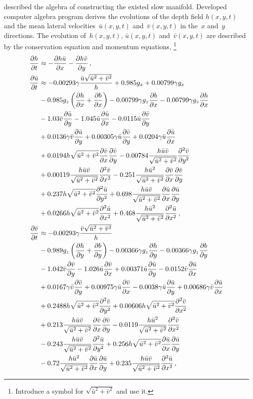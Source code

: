 \documentclass[12pt,a5paper]{article}
\newcommand{\uu}{{\bar u}}
\newcommand{\vv}{{\bar v}}
\begin{document}
\cite{Roberts:2008fk} described the algebra of constructing the existed slow manifold. Developed computer algebra program derives the evolutions of the depth field $h(x,y,t)$ and the mean lateral velocities~$\bar u(x,y,t)$ and~$\bar v(x,y,t)$ in the~$x$ and~$y$ directions. The evolution of~$h(x,y,t)$, $\bar u(x,y,t)$ and~$\bar v(x,y,t)$ are described by the conservation equation and momentum equations,
\footnote{Introduce a symbol for $\sqrt{\uu^2+\vv^2}$ and use it.}
\begin{align}
\frac{\partial h}{\partial t}&
\approx-\frac{\partial h\bar u}{\partial x}-\frac{\partial h\bar v}{\partial y}\,,\label{smag:h}
\\
\frac{\partial\bar u}{\partial t}&
\approx-0.00293\gamma\frac{\bar u\sqrt{\bar u^2+\bar v^2}}{h}+0.985g_x+0.00799\gamma g_x
\nonumber\\&
-0.985g_z\left(\frac{\partial h}{\partial x}+\frac{\partial b}{\partial x}\right)-0.00799\gamma g_z\D xb
-0.00799\gamma g_z\D xh
\nonumber\\&
-1.03\bar v\frac{\partial\bar u}{\partial y}-1.045\bar u\frac{\partial\bar u}{\partial x}-0.0115\uu\D{y}{\vv}
\nonumber\\&
+0.0136\gamma\vv\D{y}{\uu}+0.00305\gamma\uu\D{y}{\vv}+0.0204\gamma\uu\D{x}{\uu}
\nonumber\\&
+0.0194h\sqrt{\uu^2+\vv^2}\D x\vv\D y\vv-0.00784\frac{h\uu\vv}{\sqrt{\uu^2+\vv^2}}\DD{y}{\vv}
\nonumber\\&
+0.00119\frac{h\uu\vv}{\sqrt{\uu^2+\vv^2}}\DD x\vv-0.251\frac{h\uu^2}{\sqrt{\uu^2+\vv^2}}\D x\vv\D y\vv
\nonumber\\&
+0.237h\sqrt{\uu^2+\vv^2}\DD y\uu+0.698\frac{h\uu\vv}{\sqrt{\uu^2+\vv^2}}\D x\uu\D y\uu
\nonumber\\&
+0.0266h\sqrt{\uu^2+\vv^2}\DD x\uu+0.468\frac{h\uu^2}{\sqrt{\uu^2+\vv^2}}\DD x\uu\,,
\label{smag:u}
\\
\frac{\partial\bar v}{\partial t}&
\approx-0.00293\gamma\frac{\bar v\sqrt{\bar u^2+\bar v^2}}{h}
\nonumber\\&
-0.989g_z\left(\frac{\partial h}{\partial y}+\frac{\partial b}{\partial y}\right)
-0.00366\gamma g_z\D yh-0.00366\gamma g_z\D yb
\nonumber\\&
-1.042\bar v\frac{\partial\bar v}{\partial y}-1.026\bar u\frac{\partial\bar v}{\partial x}
+0.00371\uu\D y\uu-0.0152\vv\D x\uu
\nonumber\\&
+0.0167\gamma\vv\D y\vv+0.00975\gamma\uu\D x\vv-0.0038\gamma\uu\D y\uu+0.00686\gamma\vv\D x\uu
\nonumber\\&
+0.2488h\sqrt{\uu^2+\vv^2}\DD y\vv+0.00606h\sqrt{\uu^2+\vv^2}\DD x\vv
\nonumber\\&
+0.213\frac{h\uu\vv}{\sqrt{\uu^2+\vv^2}}\D x\vv\D y\vv-0.0119\frac{h\uu^2}{\sqrt{\uu^2+\vv^2}}\DD x\vv
\nonumber\\&
-0.243\frac{h\uu\vv}{\sqrt{\uu^2+\vv^2}}\DD y\uu+0.256h\sqrt{\uu^2+\vv^2}\D x\uu\D y\uu
\nonumber\\&
-0.72\frac{h\uu^2}{\sqrt{\uu^2+\vv^2}}\D x\uu\D y\uu+0.235\frac{h\uu\vv}{\sqrt{\uu^2+\vv^2}}\DD x\uu
\,,\label{smag:v}
\end{align}
\end{document}
